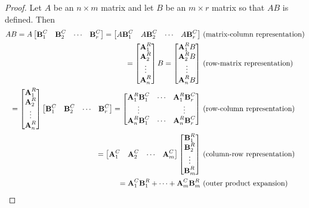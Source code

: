 \begin{proof}
	Let $A$ be an $n \times m$ matrix and let $B$ be an $m \times r$ matrix so that $AB$ is defined. Then
	\begin{align*}
	AB = A\begin{bmatrix}
	\textbf{B}^{C}_1 & \textbf{B}^{C}_2 & \cdots & \textbf{B}^{C}_r
	\end{bmatrix} = \begin{bmatrix}
	A\textbf{B}^{C}_1 & A\textbf{B}^{C}_2 & \cdots & A\textbf{B}^{C}_r
	\end{bmatrix} &\textnormal{ (matrix-column representation)} \\
	= \begin{bmatrix}
	\textbf{A}^{R}_1 \\ \textbf{A}^{R}_2 \\ \vdots \\ \textbf{A}^{R}_n
	\end{bmatrix}B = \begin{bmatrix}
	\textbf{A}^{R}_1B \\ \textbf{A}^{R}_2B \\ \vdots \\ \textbf{A}^{R}_nB
	\end{bmatrix} &\textnormal{ (row-matrix representation)} \\
	= \begin{bmatrix}
	\textbf{A}^{R}_1 \\ \textbf{A}^{R}_2 \\ \vdots \\ \textbf{A}^{R}_n
	\end{bmatrix}\begin{bmatrix}
	\textbf{B}^{C}_1 & \textbf{B}^{C}_2 & \cdots & \textbf{B}^{C}_r
	\end{bmatrix} = \begin{bmatrix}
	\textbf{A}^{R}_1\textbf{B}^{C}_1 & \cdots &
	\textbf{A}^{R}_1\textbf{B}^{C}_r \\
	\vdots & & \vdots \\
	\textbf{A}^{R}_n\textbf{B}^{C}_1 & \cdots &
	\textbf{A}^{R}_n\textbf{B}^{C}_r		
	\end{bmatrix} &\textnormal{ (row-column representation)} \\
	= \begin{bmatrix}
	\textbf{A}^{C}_1 & \textbf{A}^{C}_2 & \cdots & \textbf{A}^{C}_m
	\end{bmatrix} \begin{bmatrix}
	\textbf{B}^{R}_1 \\ \textbf{B}^{R}_2 \\ \vdots \\ \textbf{B}^{R}_m
	\end{bmatrix} &\textnormal{ (column-row representation)}\\
	= \textbf{A}^{C}_1\textbf{B}^{R}_1 + \cdots + \textbf{A}^{C}_m\textbf{B}^{R}_m &\textnormal{ (outer product expansion)}
	\end{align*}
\end{proof} 

